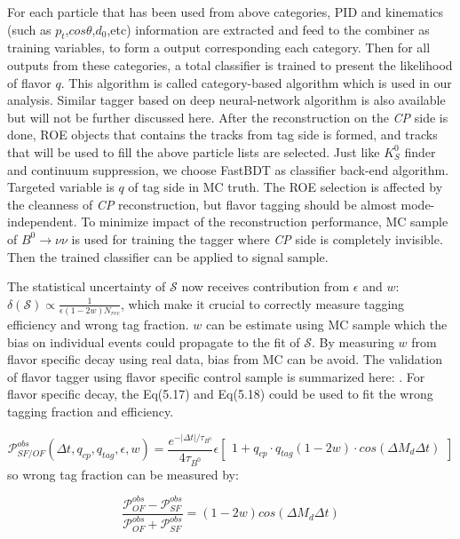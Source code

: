  
For each particle that has been used from above categories, PID and kinematics (such as $p_t$,$cos\theta$,$d_0$,etc) information are extracted and feed to the combiner as training variables, to form a output corresponding each category. Then for all outputs from these categories, a total classifier is trained to present the likelihood of flavor $q$. This algorithm is called category-based algorithm which is used in our analysis. Similar tagger based on deep neural-network algorithm is also available but will not be further discussed here. After the reconstruction on the \textit{CP} side is done, ROE objects that contains the tracks from tag side is formed, and tracks that will be used to fill the above particle lists are selected. Just like $K_S^0$ finder and continuum suppression, we choose FastBDT as classifier back-end algorithm. Targeted variable is $q$ of tag side in MC truth. The ROE selection is affected by the cleanness of \textit{CP} reconstruction, but flavor tagging should be almost mode-independent. To minimize impact of the reconstruction performance, MC sample of $B^0 \to \nu \nu$ is used for training the tagger where \textit{CP} side is completely invisible. Then the trained classifier can be applied to signal sample.

 The statistical uncertainty of $\mathcal{S}$ now receives contribution from $\epsilon$ and $w$: $\delta(\mathcal{S}) \propto \frac{1}{\epsilon (1-2w)N_{rec}}$, which make it crucial to correctly measure tagging efficiency and wrong tag fraction. $w$ can be estimate using MC sample which the bias on individual events could propagate to the fit of $\mathcal{S}$. By measuring $w$ from flavor specific decay using real data, bias from MC can be avoid. The validation of flavor tagger using flavor specific control sample is summarized here: \cite{flavortagger}. For flavor specific decay, the Eq(5.17) and Eq(5.18) could be used to fit the wrong tagging fraction and efficiency.
 
 \begin{equation}
 \mathcal{P}_{SF/OF}^{obs}(\Delta t, q_{cp},q_{tag}, \epsilon, w) = 
 \frac{e^{-|\Delta t|/\tau_{B^0}}}{4\tau_{B^0}}
 \epsilon
 \begin{bmatrix}
 1 + q_{cp}\cdot q_{tag}(1-2w)\cdot 
 cos(\Delta M_d \Delta t)
 \end{bmatrix}
 \end{equation} so wrong tag fraction can be measured by: 
 
 \begin{equation}
 \frac{\mathcal{P}_{OF}^{obs}-\mathcal{P}_{SF}^{obs}}{\mathcal{P}_{OF}^{obs}+\mathcal{P}_{SF}^{obs}}=(1-2w)cos(\Delta M_d \Delta t)
 \end{equation}
 
